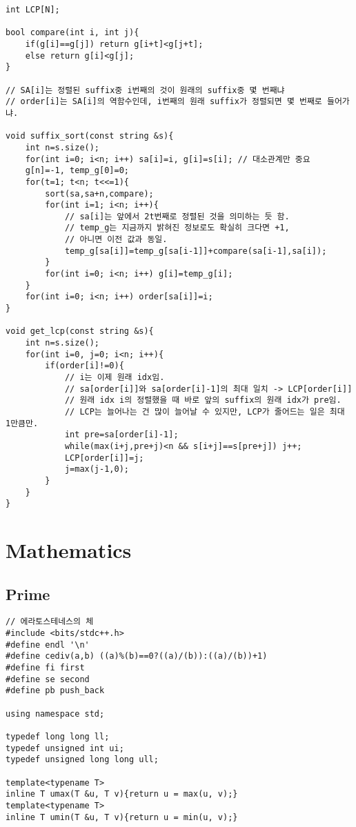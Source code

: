 \documentclass[10pt, landscape]{article}
\begin{document}
\begin{multicols}{2}
\begin{verbatim}
int LCP[N];

bool compare(int i, int j){
    if(g[i]==g[j]) return g[i+t]<g[j+t];
    else return g[i]<g[j];
}

// SA[i]는 정렬된 suffix중 i번째의 것이 원래의 suffix중 몇 번째냐
// order[i]는 SA[i]의 역함수인데, i번째의 원래 suffix가 정렬되면 몇 번째로 들어가냐.

void suffix_sort(const string &s){
    int n=s.size();
    for(int i=0; i<n; i++) sa[i]=i, g[i]=s[i]; // 대소관계만 중요
    g[n]=-1, temp_g[0]=0;
    for(t=1; t<n; t<<=1){
        sort(sa,sa+n,compare);
        for(int i=1; i<n; i++){
            // sa[i]는 앞에서 2t번째로 정렬된 것을 의미하는 듯 함.
            // temp_g는 지금까지 밝혀진 정보로도 확실히 크다면 +1, 
            // 아니면 이전 값과 동일.
            temp_g[sa[i]]=temp_g[sa[i-1]]+compare(sa[i-1],sa[i]); 
        }
        for(int i=0; i<n; i++) g[i]=temp_g[i];
    }
    for(int i=0; i<n; i++) order[sa[i]]=i;
}

void get_lcp(const string &s){
    int n=s.size();
    for(int i=0, j=0; i<n; i++){
        if(order[i]!=0){
            // i는 이제 원래 idx임.
            // sa[order[i]]와 sa[order[i]-1]의 최대 일치 -> LCP[order[i]]
            // 원래 idx i의 정렬했을 때 바로 앞의 suffix의 원래 idx가 pre임.
            // LCP는 늘어나는 건 많이 늘어날 수 있지만, LCP가 줄어드는 일은 최대 1만큼만.
            int pre=sa[order[i]-1];
            while(max(i+j,pre+j)<n && s[i+j]==s[pre+j]) j++;
            LCP[order[i]]=j;
            j=max(j-1,0);
        }
    }
}
\end{verbatim}

\section{Mathematics}
\subsection{Prime}
\begin{verbatim}
// 에라토스테네스의 체
#include <bits/stdc++.h>
#define endl '\n'
#define cediv(a,b) ((a)%(b)==0?((a)/(b)):((a)/(b))+1)
#define fi first
#define se second
#define pb push_back

using namespace std;

typedef long long ll;
typedef unsigned int ui;
typedef unsigned long long ull;

template<typename T>
inline T umax(T &u, T v){return u = max(u, v);}
template<typename T>
inline T umin(T &u, T v){return u = min(u, v);}


\end{verbatim}
\end{multicols}
\end{document}
